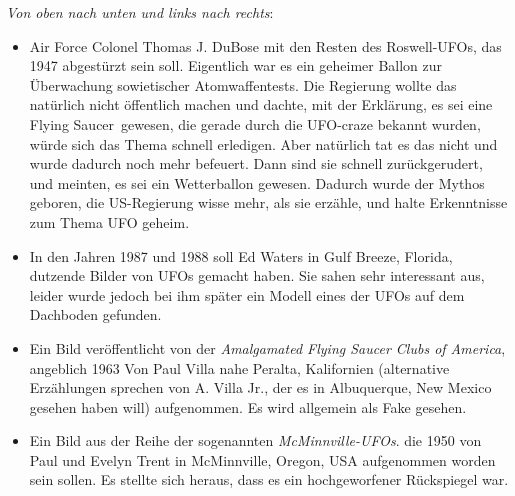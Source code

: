 \documentclass{scrartcl}
\begin{document}
\textit{Von oben nach unten und links nach rechts}:

\begin{itemize}
	\item Air Force Colonel Thomas J. DuBose mit den Resten des Roswell-\frq UFOs\flq, das 1947 abgestürzt sein soll. Eigentlich war es ein geheimer Ballon zur Überwachung sowietischer Atomwaffentests. Die Regierung wollte das natürlich nicht öffentlich machen und dachte, mit der Erklärung, es sei eine \frq Flying Saucer\flq\ gewesen, die gerade durch die UFO-craze bekannt wurden, würde sich das Thema schnell erledigen. Aber natürlich tat es das nicht und wurde dadurch noch mehr befeuert. Dann sind sie schnell zurückgerudert, und meinten, es sei ein Wetterballon gewesen. Dadurch wurde der Mythos geboren, die US-Regierung wisse mehr, als sie erzähle, und halte Erkenntnisse zum Thema UFO geheim.


	\item In den Jahren 1987 und 1988 soll Ed Waters in Gulf Breeze, Florida, dutzende Bilder von UFOs gemacht haben. Sie sahen sehr interessant aus, leider wurde jedoch bei ihm später ein Modell eines der UFOs auf dem Dachboden gefunden.

	\item Ein Bild veröffentlicht von der \frq\textit{Amalgamated Flying Saucer Clubs of America}\flq, angeblich 1963 Von Paul Villa nahe Peralta, Kalifornien (alternative Erzählungen sprechen von A. Villa Jr., der es in Albuquerque, New Mexico gesehen haben will) aufgenommen. Es wird allgemein als Fake gesehen.
	\item Ein Bild aus der Reihe der sogenannten \textit{McMinnville-UFOs}. die 1950 von Paul und Evelyn Trent in McMinnville, Oregon, USA aufgenommen worden sein sollen. Es stellte sich heraus, dass es ein hochgeworfener Rückspiegel war.


\end{itemize}
\end{document}
